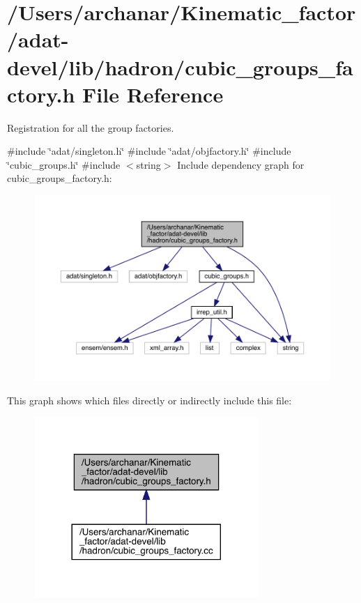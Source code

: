 \hypertarget{adat-devel_2lib_2hadron_2cubic__groups__factory_8h}{}\section{/\+Users/archanar/\+Kinematic\+\_\+factor/adat-\/devel/lib/hadron/cubic\+\_\+groups\+\_\+factory.h File Reference}
\label{adat-devel_2lib_2hadron_2cubic__groups__factory_8h}


Registration for all the group factories.  


{\ttfamily \#include \char`\"{}adat/singleton.\+h\char`\"{}}\newline
{\ttfamily \#include \char`\"{}adat/objfactory.\+h\char`\"{}}\newline
{\ttfamily \#include \char`\"{}cubic\+\_\+groups.\+h\char`\"{}}\newline
{\ttfamily \#include $<$string$>$}\newline
Include dependency graph for cubic\+\_\+groups\+\_\+factory.\+h\+:
\nopagebreak
\begin{figure}[H]
\begin{center}
\leavevmode
\includegraphics[width=350pt]{d8/d98/adat-devel_2lib_2hadron_2cubic__groups__factory_8h__incl}
\end{center}
\end{figure}
This graph shows which files directly or indirectly include this file\+:
\nopagebreak
\begin{figure}[H]
\begin{center}
\leavevmode
\includegraphics[width=240pt]{d2/de1/adat-devel_2lib_2hadron_2cubic__groups__factory_8h__dep__incl}
\end{center}
\end{figure}
